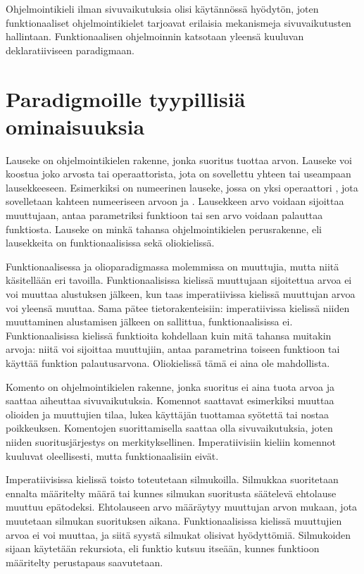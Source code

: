 Ohjelmointikieli ilman sivuvaikutuksia olisi käytännössä hyödytön, joten funktionaaliset ohjelmointikielet tarjoavat erilaisia mekanismeja sivuvaikutusten hallintaan.  Funktionaalisen ohjelmoinnin katsotaan yleensä kuuluvan deklaratiiviseen paradigmaan. \cite[Luku 11]{principlesAndParadigms}


\section{Paradigmoille tyypillisiä ominaisuuksia}
Lauseke on ohjelmointikielen rakenne, jonka suoritus tuottaa arvon. Lauseke voi koostua joko arvosta tai operaattorista, jota on sovellettu yhteen tai useampaan lausekkeeseen. Esimerkiksi  on numeerinen lauseke, jossa on yksi operaattori \code{+}, jota sovelletaan kahteen numeeriseen arvoon  ja . Lausekkeen arvo voidaan sijoittaa muuttujaan, antaa parametriksi funktioon tai sen arvo voidaan palauttaa funktiosta. Lauseke on minkä tahansa ohjelmointikielen perusrakenne, eli lausekkeita on funktionaalisissa sekä oliokielissä.
\cite[Luku 6]{principlesAndParadigms}

Funktionaalisessa ja olioparadigmassa molemmissa on muuttujia, mutta niitä käsitellään eri tavoilla. Funktionaalisissa kielissä muuttujaan sijoitettua arvoa ei voi muuttaa alustuksen jälkeen, kun taas imperatiivissa kielissä muuttujan arvoa voi yleensä muuttaa. Sama pätee tietorakenteisiin: imperatiivissa kielissä niiden muuttaminen alustamisen jälkeen on sallittua, funktionaalisissa ei. \cite[Luku 3]{functionalProgrammingInScala} Funktionaalisissa kielissä funktioita kohdellaan kuin mitä tahansa muitakin arvoja: niitä voi sijoittaa muuttujiin, antaa parametrina toiseen funktioon tai käyttää funktion palautusarvona. Oliokielissä tämä ei aina ole mahdollista.
\cite[Luku 6]{principlesAndParadigms}

Komento on ohjelmointikielen rakenne, jonka suoritus ei aina tuota arvoa ja saattaa aiheuttaa sivuvaikutuksia. Komennot saattavat esimerkiksi muuttaa olioiden ja muuttujien tilaa, lukea käyttäjän tuottamaa syötettä tai nostaa poikkeuksen. Komentojen suorittamisella saattaa olla sivuvaikutuksia, joten niiden suoritusjärjestys on merkityksellinen. Imperatiivisiin kieliin komennot kuuluvat oleellisesti, mutta funktionaalisiin eivät.

Imperatiivisissa kielissä toisto toteutetaan silmukoilla. Silmukkaa suoritetaan ennalta määritelty määrä tai kunnes silmukan suoritusta säätelevä ehtolause muuttuu epätodeksi. Ehtolauseen arvo määräytyy muuttujan arvon mukaan, jota muutetaan silmukan suorituksen aikana. Funktionaalisissa kielissä muuttujien arvoa ei voi muuttaa, ja siitä syystä silmukat olisivat hyödyttömiä. Silmukoiden sijaan käytetään rekursiota, eli funktio kutsuu itseään, kunnes funktioon määritelty perustapaus saavutetaan.
\cite[Luku 6 ja 11]{principlesAndParadigms}

